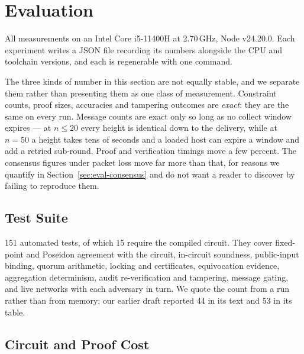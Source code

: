 \documentclass{llncs}
\begin{document}
\section{Evaluation}
\label{sec:eval}

All measurements on an Intel Core i5-11400H at 2.70\,GHz, Node
v24.20.0. Each experiment writes a JSON file recording its numbers alongside the
CPU and toolchain versions, and each is regenerable with one command.

The three kinds of number in this section are not equally stable, and we
separate them rather than presenting them as one class of measurement.
Constraint counts, proof sizes, accuracies and tampering outcomes are
\emph{exact}: they are the same on every run. Message counts are exact only so
long as no collect window expires --- at $n \le 20$ every height is identical
down to the delivery, while at $n = 50$ a height takes tens of seconds and a
loaded host can expire a window and add a retried sub-round. Proof and
verification timings move a few percent. The consensus figures under packet loss
move far more than that, for reasons we quantify in
Section~\ref{sec:eval-consensus} and do not want a reader to discover by failing
to reproduce them.

\subsection{Test Suite}
\label{sec:eval-tests}

151 automated tests, of which 15 require the compiled circuit. They cover
fixed-point and Poseidon agreement with the circuit, in-circuit soundness,
public-input binding, quorum arithmetic, locking and certificates, equivocation
evidence, aggregation determinism, audit re-verification and tampering, message
gating, and live networks with each adversary in turn. We quote the count from a
run rather than from memory; our earlier draft reported 44 in its text and 53 in
its table.

\subsection{Circuit and Proof Cost}
\label{sec:eval-proof}
\end{document}
